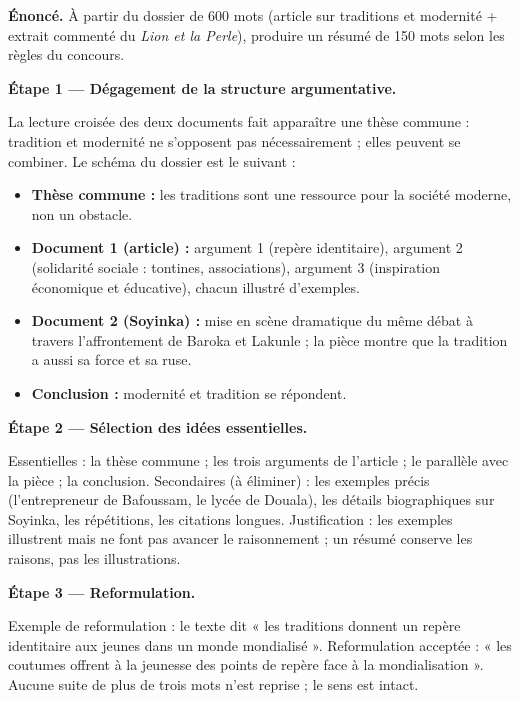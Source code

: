 \documentclass[11pt]{article}
\newcounter{popsec}
\newcounter{popsub}
\newcommand{\courssub}[1]{%
  \stepcounter{popsub}%
  \par\vspace{9pt}\noindent{\popxbold\fontsize{11.5}{13}\selectfont\color{popink}{\color{poporange}\thepopsec.\thepopsub}\hspace{6pt}#1}\par\nopagebreak\vspace{4pt}
}
\begin{document}
\courssub{Démarche et corrigé commenté}

\begin{exoresolu}
\textbf{Énoncé.} À partir du dossier de 600 mots (article sur traditions et modernité + extrait commenté du \emph{Lion et la Perle}), produire un résumé de 150 mots selon les règles du concours.

\tcblower

\textbf{Étape 1 — Dégagement de la structure argumentative.}

La lecture croisée des deux documents fait apparaître une thèse commune : tradition et modernité ne s'opposent pas nécessairement ; elles peuvent se combiner. Le schéma du dossier est le suivant :

\begin{itemize}
\item \textbf{Thèse commune :} les traditions sont une ressource pour la société moderne, non un obstacle.
\item \textbf{Document 1 (article) :} argument 1 (repère identitaire), argument 2 (solidarité sociale : tontines, associations), argument 3 (inspiration économique et éducative), chacun illustré d'exemples.
\item \textbf{Document 2 (Soyinka) :} mise en scène dramatique du même débat à travers l'affrontement de Baroka et Lakunle ; la pièce montre que la tradition a aussi sa force et sa ruse.
\item \textbf{Conclusion :} modernité et tradition se répondent.
\end{itemize}

\textbf{Étape 2 — Sélection des idées essentielles.}

Essentielles : la thèse commune ; les trois arguments de l'article ; le parallèle avec la pièce ; la conclusion. Secondaires (à éliminer) : les exemples précis (l'entrepreneur de Bafoussam, le lycée de Douala), les détails biographiques sur Soyinka, les répétitions, les citations longues. Justification : les exemples illustrent mais ne font pas avancer le raisonnement ; un résumé conserve les raisons, pas les illustrations.

\textbf{Étape 3 — Reformulation.}

Exemple de reformulation : le texte dit « les traditions donnent un repère identitaire aux jeunes dans un monde mondialisé ». Reformulation acceptée : « les coutumes offrent à la jeunesse des points de repère face à la mondialisation ». Aucune suite de plus de trois mots n'est reprise ; le sens est intact.


\end{exoresolu}
\end{document}
